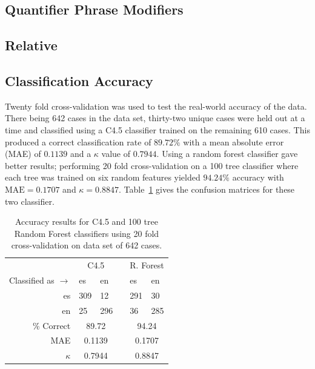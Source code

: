 \documentclass[main.tex]{subfiles}
\begin{document}
\subsection{Quantifier Phrase Modifiers}
\subsection{Relative}

\subsection{Classification Accuracy}

Twenty fold cross-validation was used to test the real-world accuracy of the data. There being 642 cases in the data set, thirty-two unique cases were held out at a time and classified using a C4.5 classifier trained on the remaining 610 cases. This produced a correct classification rate of $89.72\%$ with a mean absolute error (MAE) of $0.1139$ and a $\kappa$ value of $0.7944$. Using a random forest classifier gave better results; performing 20 fold cross-validation on a 100 tree classifier where each tree was trained on six random features yielded $94.24\%$ accuracy with $\text{MAE} = 0.1707$ and $\kappa = 0.8847$. Table~\ref{table:dep-results} gives the confusion matrices for these two classifier.

\begin{table}
\centering
\caption{Accuracy results for C4.5 and 100 tree Random Forest classifiers using 20 fold cross-validation on data set of 642 cases.}
\begin{tabular}{r l l l l l}
\toprule
&\multicolumn{2}{c}{C4.5}& & \multicolumn{2}{c}{R. Forest}\\
\cmidrule{2-3} \cmidrule{5-6}
Classified as $\rightarrow$ & es & en && es & en\\
es &309 & 12 && 291 & 30 \\
en &25 & 296 && 36 & 285 \\
\cmidrule{2-3} \cmidrule{5-6}
\% Correct & \multicolumn{2}{c}{89.72} && \multicolumn{2}{c}{94.24} \\
MAE & \multicolumn{2}{c}{0.1139} && \multicolumn{2}{c}{0.1707} \\
$\kappa$ & \multicolumn{2}{c}{0.7944} && \multicolumn{2}{c}{0.8847} \\
\bottomrule
\end{tabular}

\label{table:dep-results}
\end{table}

\biblio
\end{document}
